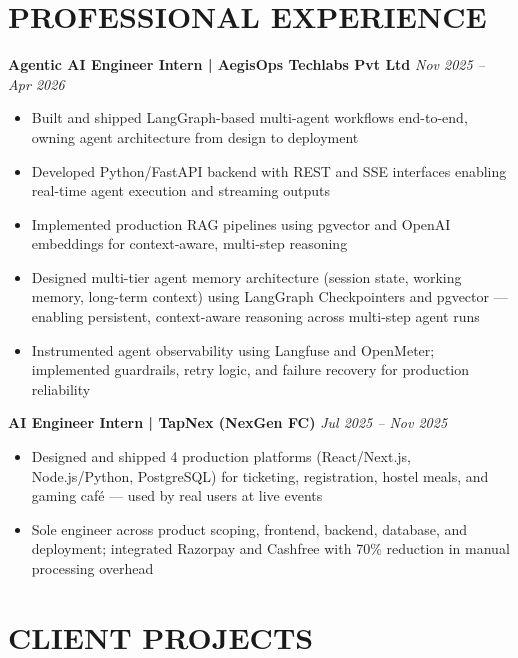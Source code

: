 \documentclass[9.5pt,a4paper]{article}
\begin{document}
\section*{PROFESSIONAL EXPERIENCE}

\textbf{Agentic AI Engineer Intern | AegisOps Techlabs Pvt Ltd} \hfill \textit{Nov 2025 -- Apr 2026}
\begin{itemize}
\item Built and shipped LangGraph-based multi-agent workflows end-to-end, owning agent architecture from design to deployment
\item Developed Python/FastAPI backend with REST and SSE interfaces enabling real-time agent execution and streaming outputs
\item Implemented production RAG pipelines using pgvector and OpenAI embeddings for context-aware, multi-step reasoning
\item Designed multi-tier agent memory architecture (session state, working memory, long-term context) using LangGraph Checkpointers and pgvector --- enabling persistent, context-aware reasoning across multi-step agent runs
\item Instrumented agent observability using Langfuse and OpenMeter; implemented guardrails, retry logic, and failure recovery for production reliability
\end{itemize}

\textbf{AI Engineer Intern | TapNex (NexGen FC)} \hfill \textit{Jul 2025 -- Nov 2025}
\begin{itemize}
\item Designed and shipped 4 production platforms (React/Next.js, Node.js/Python, PostgreSQL) for ticketing, registration, hostel meals, and gaming caf\'e --- used by real users at live events
\item Sole engineer across product scoping, frontend, backend, database, and deployment; integrated Razorpay and Cashfree with 70\% reduction in manual processing overhead
\end{itemize}

\section*{CLIENT PROJECTS}
\end{document}
